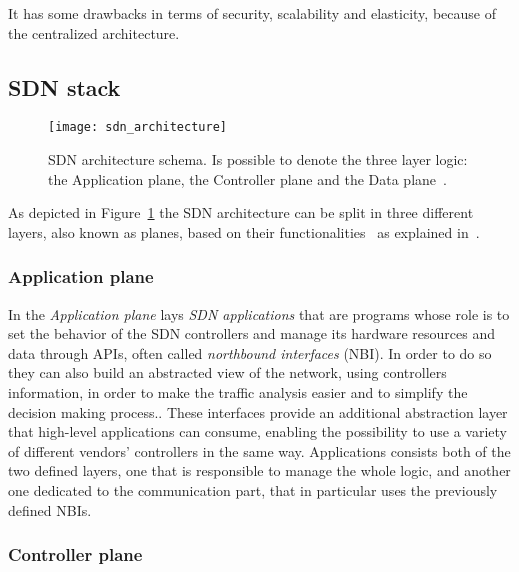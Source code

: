 It has some drawbacks in terms of
security, scalability and elasticity, because of the centralized architecture.

\subsection{SDN stack}
\begin{figure}[ht]
 \centering
 \texttt{[image: sdn\_architecture]}
 \caption[SDN architecture schema]{SDN architecture schema. Is possible to 
denote the three layer logic: the Application plane, the Controller plane and 
the Data plane~\cite{fundation2013software}.}
 \label{chap:background:img:sdn_architecture}
\end{figure}
As depicted in Figure~\ref{chap:background:img:sdn_architecture} the SDN
architecture can be split in three different layers, also known as planes,
based on their functionalities~\cite{fundation2012software} as explained
in~\cite{fundation2013software}.

\subsubsection{Application plane}

In the \emph{Application plane} lays \emph{SDN applications} that are programs
whose role is to set the behavior of the SDN controllers 
and manage its hardware resources and data through APIs, often called 
\emph{northbound interfaces} (NBI). In order to do so they can also build an
abstracted view of the network, using controllers information, in order to make
the traffic analysis easier and to simplify the decision making process..
These interfaces provide an additional abstraction layer that high-level 
applications can consume, enabling the possibility to use a variety of 
different vendors' controllers in the same way. Applications consists both of
the two defined layers, one that is responsible to manage the whole logic, and
another one dedicated to the communication part, that in particular uses the
previously defined NBIs.

\subsubsection{Controller plane}

